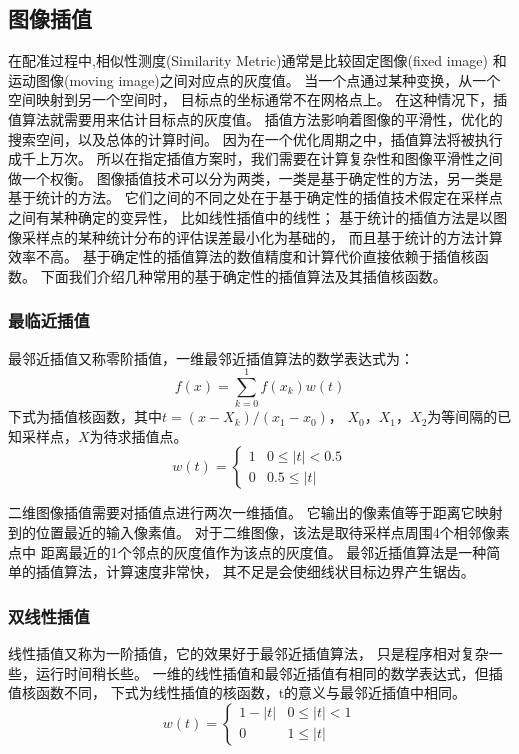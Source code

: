 \subsection{图像插值}%
在配准过程中,相似性测度(Similarity Metric)通常是比较固定图像(fixed image)
和运动图像(moving image)之间对应点的灰度值。
当一个点通过某种变换，从一个空间映射到另一个空间时，
目标点的坐标通常不在网格点上。
在这种情况下，插值算法就需要用来估计目标点的灰度值。
插值方法影响着图像的平滑性，优化的搜索空间，以及总体的计算时间。
因为在一个优化周期之中，插值算法将被执行成千上万次。
所以在指定插值方案时，我们需要在计算复杂性和图像平滑性之间做一个权衡。
图像插值技术可以分为两类，一类是基于确定性的方法，另一类是基于统计的方法。
它们之间的不同之处在于基于确定性的插值技术假定在采样点之间有某种确定的变异性，
比如线性插值中的线性；
基于统计的插值方法是以图像采样点的某种统计分布的评估误差最小化为基础的，
而且基于统计的方法计算效率不高。
基于确定性的插值算法的数值精度和计算代价直接依赖于插值核函数。
下面我们介绍几种常用的基于确定性的插值算法及其插值核函数。
\subsubsection{最临近插值}
最邻近插值又称零阶插值，一维最邻近插值算法的数学表达式为：
\begin{equation}
  f(x)=\sum_{k=0}^1f(x_k)w(t)
\end{equation}
下式为插值核函数，其中$t=(x-X_k)/(x_1-x_0)$，
$X_0$，$X_1$，$X_2$为等间隔的已知采样点，$X$为待求插值点。
\begin{equation}
  w(t)=
  \begin{cases}
    1& 0\le\lvert t\rvert<0.5\\
    0& 0.5\le\lvert t\rvert
  \end{cases}
\end{equation}

二维图像插值需要对插值点进行两次一维插值。
它输出的像素值等于距离它映射到的位置最近的输入像素值。
对于二维图像，该法是取待采样点周围4个相邻像素点中
距离最近的1个邻点的灰度值作为该点的灰度值。
最邻近插值算法是一种简单的插值算法，计算速度非常快，
其不足是会使细线状目标边界产生锯齿。

\subsubsection{双线性插值}
线性插值又称为一阶插值，它的效果好于最邻近插值算法，
只是程序相对复杂一些，运行时间稍长些。
一维的线性插值和最邻近插值有相同的数学表达式，但插值核函数不同，
下式为线性插值的核函数，t的意义与最邻近插值中相同。
\begin{equation}
  w(t)=
  \begin{cases}
    1-\lvert t\rvert & 0\le\lvert t\rvert<1\\
    0& 1\le\lvert t\rvert
  \end{cases}
\end{equation}

